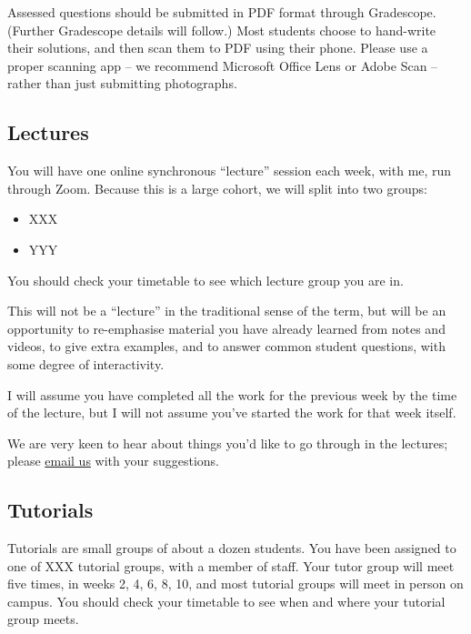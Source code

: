 \documentclass[
  a4paper,
]{book}
\providecommand{\tightlist}{%
  \setlength{\itemsep}{0pt}\setlength{\parskip}{0pt}}
\theoremstyle{definition}
\theoremstyle{definition}
\theoremstyle{definition}
\theoremstyle{remark}
\begin{document}
Assessed questions should be submitted in PDF format through Gradescope. (Further Gradescope details will follow.) Most students choose to hand-write their solutions, and then scan them to PDF using their phone. Please use a proper scanning app -- we recommend Microsoft Office Lens or Adobe Scan -- rather than just submitting photographs.

\hypertarget{lectures}{%
\subsection*{Lectures}\label{lectures}}

You will have one online synchronous ``lecture'' session each week, with me, run through Zoom. Because this is a large cohort, we will split into two groups:

\begin{itemize}
\tightlist
\item
  XXX
\item
  YYY
\end{itemize}

You should check your timetable to see which lecture group you are in.

This will not be a ``lecture'' in the traditional sense of the term, but will be an opportunity to re-emphasise material you have already learned from notes and videos, to give extra examples, and to answer common student questions, with some degree of interactivity.

I will assume you have completed all the work for the previous week by the time of the lecture, but I will not assume you've started the work for that week itself.

We are very keen to hear about things you'd like to go through in the lectures; please \href{mailto:math1710@leeds.ac.uk}{email us} with your suggestions.

\hypertarget{tutorials}{%
\subsection*{Tutorials}\label{tutorials}}

Tutorials are small groups of about a dozen students. You have been assigned to one of XXX tutorial groups, with a member of staff. Your tutor group will meet five times, in weeks 2, 4, 6, 8, 10, and most tutorial groups will meet in person on campus. You should check your timetable to see when and where your tutorial group meets.
\end{document}
